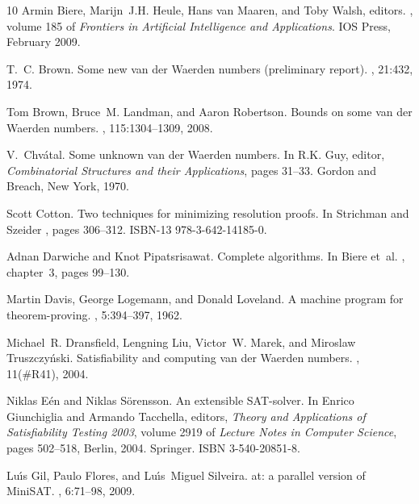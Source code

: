 \documentclass[final,3p,times]{elsarticle}
\theoremstyle{definition}
\begin{document}
\begin{thebibliography}{10}
Armin Biere, Marijn~J.H. Heule, Hans van Maaren, and Toby Walsh, editors.
, volume 185 of {\em Frontiers in
  Artificial Intelligence and Applications}.
\newblock IOS Press, February 2009.

T.~C. Brown.
\newblock Some new van der {W}aerden numbers (preliminary report).
, 21:432, 1974.

Tom Brown, Bruce~M. Landman, and Aaron Robertson.
\newblock Bounds on some van der {W}aerden numbers.
, 115:1304--1309,
  2008.

V.~Chv{\'{a}}tal.
\newblock Some unknown van der {W}aerden numbers.
\newblock In R.K. Guy, editor, {\em Combinatorial Structures and their
  Applications}, pages 31--33. Gordon and Breach, New York, 1970.

Scott Cotton.
\newblock Two techniques for minimizing resolution proofs.
\newblock In Strichman and Szeider \cite{Edinburgh2010}, pages 306--312.
\newblock ISBN-13 978-3-642-14185-0.

Adnan Darwiche and Knot Pipatsrisawat.
\newblock Complete algorithms.
\newblock In Biere et~al. \cite{2008HandbuchSAT}, chapter~3, pages 99--130.

Martin Davis, George Logemann, and Donald Loveland.
\newblock A machine program for theorem-proving.
, 5:394--397, 1962.

Michael~R. Dransfield, Lengning Liu, Victor~W. Marek, and Miroslaw
  Truszczy{\'{n}}ski.
\newblock Satisfiability and computing van der {W}aerden numbers.
, 11(\#{}R41), 2004.

Niklas E{\'{e}}n and Niklas S{\"{o}}rensson.
\newblock An extensible {SAT}-solver.
\newblock In Enrico Giunchiglia and Armando Tacchella, editors, {\em Theory and
  Applications of Satisfiability Testing 2003}, volume 2919 of {\em Lecture
  Notes in Computer Science}, pages 502--518, Berlin, 2004. Springer.
\newblock ISBN 3-540-20851-8.

Lu{\'{\i}}s Gil, Paulo Flores, and Lu{\'{\i}}s~Miguel Silveira.
at: a parallel version of {M}ini{SAT}.
,
  6:71--98, 2009.


\end{thebibliography}
\end{document}
